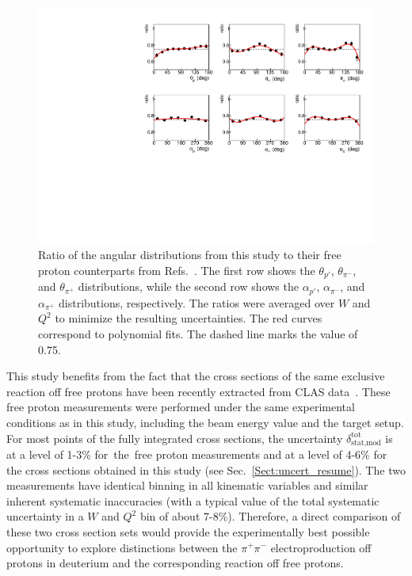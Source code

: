 \documentclass[prc,twocolumn,superscriptaddress,showpacs,amssymb,amsmath,amsfonts,aps,nofootinbib]{revtex4-1}
\begin{document}
\begin{figure}[htp]
\begin{center}
\includegraphics[width=12cm]{pictures/fed_comp/angles2.pdf}
\caption{\small Ratio of the angular distributions from this study to their free proton counterparts from Refs.\!~\cite{Fed_an_note:2017,Fed_paper_2018}. The first row shows the $\theta_{p'}$, $\theta_{\pi^{-}}$, and $\theta_{\pi^{+}}$ distributions, while the second row shows the $\alpha_{p'}$, $\alpha_{\pi^{-}}$, and $\alpha_{\pi^{+}}$ distributions, respectively. The ratios were averaged over $W$ and $Q^{2}$ to minimize the resulting uncertainties. The red curves correspond to polynomial fits. The dashed line marks the value of 0.75.} \label{fig:fed_ang}
\end{center}
\end{figure}


This study benefits from the fact that the cross sections of the same exclusive reaction off free protons have been recently extracted from CLAS data~\cite{Fed_an_note:2017,Fed_paper_2018}. These free proton measurements were performed under the same experimental conditions as in this study, including the beam energy value and the target setup. For most points of the fully integrated cross sections, the uncertainty $\delta_{\text{stat,mod}}^{\text{tot}}$ is at a level of 1-3\% for~the~free proton measurements and at a level of 4-6\% for the cross sections obtained in this study (see Sec.\!~\ref{Sect:uncert_resume}). The two measurements have identical binning in all kinematic variables and similar inherent systematic inaccuracies (with a typical value of the total systematic uncertainty in a $W$ and $Q^2$ bin of about 7-8\%). Therefore, a direct comparison of these two cross section sets would provide the experimentally best possible opportunity to explore distinctions between the $\pi^{+}\pi^{-}$ electroproduction off protons in deuterium and the corresponding reaction off free protons.
\end{document}

